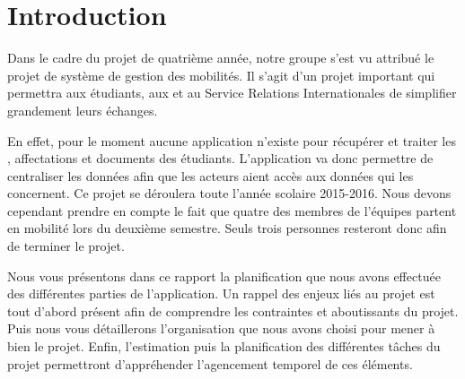 \chapter*{Introduction}

Dans le cadre du projet de quatrième année, notre groupe s'est vu attribué le projet de système de gestion des mobilités. Il s'agit d'un projet important qui permettra aux étudiants, aux \ris et au Service Relations Internationales de simplifier grandement leurs échanges. 

En effet, pour le moment aucune application n'existe pour récupérer et traiter les \voe, affectations et documents des étudiants. L'application va donc permettre de centraliser les données afin que les acteurs aient accès aux données qui les concernent. Ce projet se déroulera toute l'année scolaire 2015-2016. Nous devons cependant prendre en compte le fait que quatre des membres de l'équipes partent en mobilité lors du deuxième semestre. Seuls trois personnes resteront donc afin de terminer le projet.

\bigbreak

Nous vous présentons dans ce rapport la planification que nous avons effectuée des différentes parties de l'application. Un rappel des enjeux liés au projet est tout d'abord présent afin de comprendre les contraintes et aboutissants du projet. Puis nous vous détaillerons l'organisation que nous avons choisi pour mener à bien le projet. Enfin, l'estimation puis la planification des différentes tâches du projet permettront d'appréhender l'agencement temporel de ces éléments.